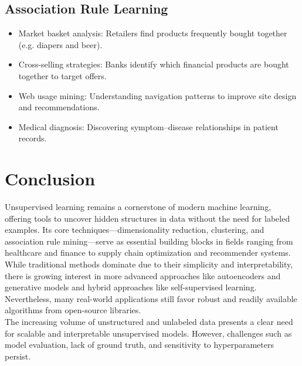 \documentclass[conference]{IEEEtran}
\begin{document}
\subsection{Association Rule Learning}
\begin{itemize}
    \item Market basket analysis: Retailers find products frequently bought together (e.g. diapers and beer).
    
    \item Cross-selling strategies: Banks identify which financial products are bought together to target offers.
    
    \item Web usage mining: Understanding navigation patterns to improve site design and recommendations.
    
    \item Medical diagnosis: Discovering symptom–disease relationships in patient records.
\end{itemize}

\section{Conclusion}

Unsupervised learning remains a cornerstone of modern machine learning, offering tools to uncover hidden structures in data without the need for labeled examples. Its core techniques—dimensionality reduction, clustering, and association rule mining—serve as essential building blocks in fields ranging from healthcare and finance to supply chain optimization and recommender systems. \\

While traditional methods dominate due to their simplicity and interpretability, there is growing interest in more advanced approaches like autoencoders and generative models and hybrid approaches like self-supervised learning. Nevertheless, many real-world applications still favor robust and readily available algorithms from open-source libraries. \\

The increasing volume of unstructured and unlabeled data presents a clear need for scalable and interpretable unsupervised models. However, challenges such as model evaluation, lack of ground truth, and sensitivity to hyperparameters persist. \\
\end{document}

